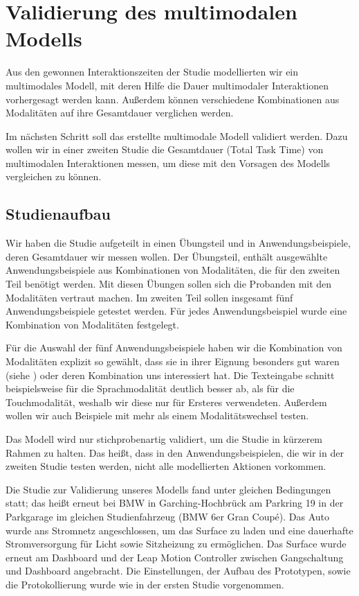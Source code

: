 \chapter[Validierung]{Validierung des multimodalen Modells}\label{cha:Evaluation}
Aus den gewonnen Interaktionszeiten der Studie modellierten wir ein multimodales Modell, mit deren Hilfe die Dauer multimodaler Interaktionen vorhergesagt werden kann.
Außerdem können verschiedene Kombinationen aus Modalitäten auf ihre Gesamtdauer verglichen werden. 

Im nächsten Schritt soll das erstellte multimodale Modell validiert werden. 
Dazu wollen wir in einer zweiten Studie die Gesamtdauer (Total Task Time) von multimodalen Interaktionen messen, um diese mit den Vorsagen des Modells vergleichen zu können. 

\section[Studienaufbau]{Studienaufbau}
Wir haben die Studie aufgeteilt in einen Übungsteil und in Anwendungsbeispiele, deren Gesamtdauer wir messen wollen. 
Der Übungsteil, enthält ausgewählte Anwendungsbeispiele aus Kombinationen von Modalitäten, die für den zweiten Teil benötigt werden. 
Mit diesen Übungen sollen sich die Probanden mit den Modalitäten vertraut machen. 
Im zweiten Teil sollen insgesamt fünf Anwendungsbeispiele getestet werden.
Für jedes Anwendungsbeispiel wurde eine Kombination von Modalitäten festgelegt. 

Für die Auswahl der fünf Anwendungsbeispiele haben wir die Kombination von Modalitäten explizit so gewählt, dass sie in ihrer Eignung besonders gut waren (siehe ) oder deren Kombination uns interessiert hat.
Die Texteingabe schnitt beispielsweise für die Sprachmodalität deutlich besser ab, als für die Touchmodalität, weshalb wir diese nur für Ersteres verwendeten.
Außerdem wollen wir auch Beispiele mit mehr als einem Modalitätswechsel testen. 

Das Modell wird nur stichprobenartig validiert, um die Studie in kürzerem Rahmen zu halten. 
Das heißt, dass in den Anwendungsbeispielen, die wir in der zweiten Studie testen werden, nicht alle modellierten Aktionen vorkommen. 

Die Studie zur Validierung unseres Modells fand unter gleichen Bedingungen statt; das heißt erneut bei BMW in Garching-Hochbrück am Parkring 19 in der Parkgarage im gleichen Studienfahrzeug (BMW 6er Gran Coupé). 
Das Auto wurde ans Stromnetz angeschlossen, um das Surface zu laden und eine dauerhafte Stromversorgung für Licht sowie Sitzheizung zu ermöglichen.
Das Surface wurde erneut am Dashboard und der Leap Motion Controller zwischen Gangschaltung und Dashboard angebracht. Die Einstellungen, der Aufbau des Prototypen, sowie die Protokollierung wurde wie in der ersten Studie vorgenommen. 

